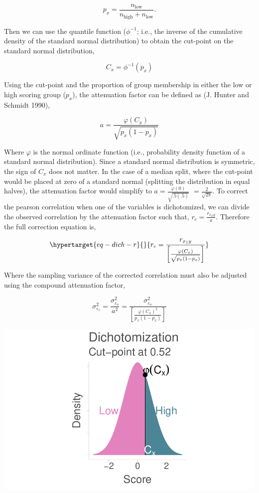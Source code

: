 \documentclass[
  letterpaper,
  DIV=11,
  numbers=noendperiod]{scrreprt}
\begin{document}
\[
p_x = \frac{ n_{\text{low}} }{n_{\text{high}} + n_{\text{low}}}.
\]

Then we can use the quantile function (\(\phi^{-1}\); i.e., the inverse
of the cumulative density of the standard normal distribution) to obtain
the cut-point on the standard normal distribution,

\[
C_x = \phi^{-1}(p_x)
\]

Using the cut-point and the proportion of group membership in either the
low or high scoring group (\(p_x\)), the attenuation factor can be
defined as (J. Hunter and Schmidt 1990),

\[
a =\frac{\varphi(C_x)}{\sqrt{p_x(1-p_x)}} 
\]

Where \(\varphi\) is the normal ordinate function (i.e., probability
density function of a standard normal distribution). Since a standard
normal distribution is symmetric, the sign of \(C_x\) does not matter.
In the case of a median split, where the cut-point would be placed at
zero of a standard normal (splitting the distribution in equal halves),
the attenuation factor would simplify to
\(a =\frac{\varphi(0)}{\sqrt{.5(.5)}}\) \(=\frac{2}{\sqrt{2\pi}}\). To
correct the pearson correlation when one of the variables is
dichotomized, we can divide the observed correlation by the attenuation
factor such that, \(r_c = \frac{r_{x_Dy}}{a}\). Therefore the full
correction equation is,

\begin{equation}\protect\hypertarget{eq-dich-r}{}{
r_c = \frac{r_{x_\ddagger y}}{\left[\frac{\varphi(C_x)}{\sqrt{p_x(1-p_x)}} \right]}
}\label{eq-dich-r}\end{equation}

Where the sampling variance of the corrected correlation must also be
adjusted using the compound attenuation factor,

\[
\sigma^2_{\varepsilon_c} =\frac{\sigma^2_{\varepsilon_o}} {a^2} =\frac{\sigma^2_{\varepsilon_o}} {\left[\frac{\varphi(C_x)^2}{p_x(1-p_x)} \right]}
\]

\includegraphics{artificial_dichotomization_files/figure-pdf/unnamed-chunk-2-1.pdf}
\end{document}
